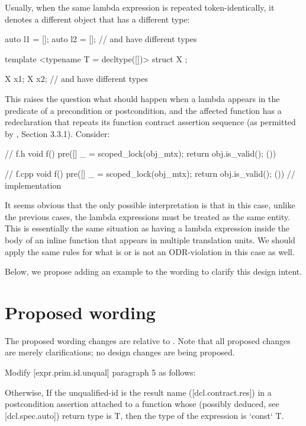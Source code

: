 Usually, when the same lambda expression is repeated token-identically, it denotes a different object that has a different type:
\begin{codeblock}
auto l1 = []{};  
auto l2 = []{};
//  and  have different types

template <typename T = decltype([]{})>
struct X {};

X x1;
X x2;
//  and  have different types
\end{codeblock}
This raises the question what should happen when a lambda appears in the predicate of a precondition or postcondition, and the affected function has a redeclaration that repeats its function contract assertion sequence (as permitted by \cite{P2900R10}, Section 3.3.1). Consider:
\begin{codeblock}
// f.h
void f() pre([]{ _ = scoped_lock(obj_mtx); return obj.is_valid(); }())

// f.cpp  
void f() pre([]{ _ = scoped_lock(obj_mtx); return obj.is_valid(); }()) {
  // implementation
}
\end{codeblock}
It seems obvious that the only possible interpretation is that in this case, unlike the previous cases, the lambda expressions must be treated as the same entity. This is essentially the same situation as having a lambda expression inside the body of an inline function that appears in multiple translation units. We should apply the same rules for what is or is not an ODR-violation in this case as well.

Below, we propose adding an example to the wording to clarify this design intent.

\section{Proposed wording}

The proposed wording changes are relative to \cite{P2900R10}. Note that all proposed changes are merely clarifications; no design changes are being proposed.

Modify [expr.prim.id.unqual] paragraph 5 as follows:
\begin{addedblock}
[5] Otherwise, If the unqualified-id is the result name ([dcl.contract.res])
in a postcondition assertion attached to a function whose (possibly
deduced, see [dcl.spec.auto]) return type is T, then the type of the expression is `const` T.
\end{addedblock}

